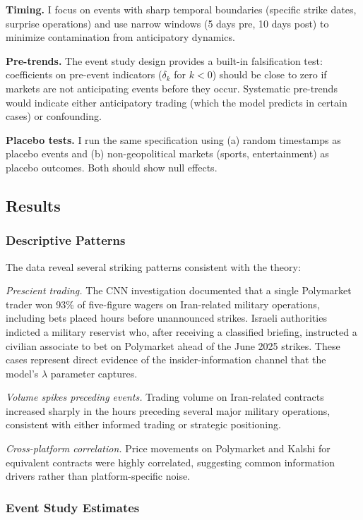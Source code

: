 \documentclass[12pt]{article}
\begin{document}
\textbf{Timing.} I focus on events with sharp temporal boundaries (specific strike dates, surprise operations) and use narrow windows (5 days pre, 10 days post) to minimize contamination from anticipatory dynamics.

\textbf{Pre-trends.} The event study design provides a built-in falsification test: coefficients on pre-event indicators ($\delta_k$ for $k < 0$) should be close to zero if markets are not anticipating events before they occur. Systematic pre-trends would indicate either anticipatory trading (which the model predicts in certain cases) or confounding.

\textbf{Placebo tests.} I run the same specification using (a) random timestamps as placebo events and (b) non-geopolitical markets (sports, entertainment) as placebo outcomes. Both should show null effects.

\subsection{Results}

\subsubsection{Descriptive Patterns}

The data reveal several striking patterns consistent with the theory:

\textit{Prescient trading.} The CNN investigation documented that a single Polymarket trader won 93\% of five-figure wagers on Iran-related military operations, including bets placed hours before unannounced strikes. Israeli authorities indicted a military reservist who, after receiving a classified briefing, instructed a civilian associate to bet on Polymarket ahead of the June 2025 strikes. These cases represent direct evidence of the insider-information channel that the model's $\lambda$ parameter captures.

\textit{Volume spikes preceding events.} Trading volume on Iran-related contracts increased sharply in the hours preceding several major military operations, consistent with either informed trading or strategic positioning.

\textit{Cross-platform correlation.} Price movements on Polymarket and Kalshi for equivalent contracts were highly correlated, suggesting common information drivers rather than platform-specific noise.

\subsubsection{Event Study Estimates}
\end{document}
